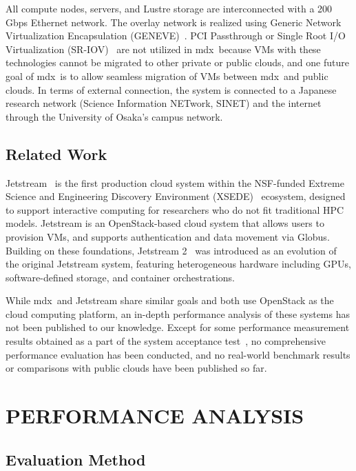 \documentclass[a4paper,twoside]{article}
\newcommand{\mdx}{mdx\,\uppercase\expandafter{\romannumeral 2\relax}}
\begin{document}
All compute nodes, servers, and Lustre storage are interconnected with a 200\,Gbps Ethernet network.
The overlay network is realized using Generic Network Virtualization Encapsulation
(GENEVE)~\cite{Gross2020}. PCI Passthrough or Single Root I/O Virtualization
(SR-IOV)~\cite{Lockwood2014} are not utilized in \mdx{} because VMs with these technologies cannot
be migrated to other private or public clouds, and one future goal of \mdx{} is to allow seamless
migration of VMs between \mdx{} and public clouds. In terms of external connection, the system is
connected to a Japanese research network (Science Information NETwork, SINET) and the internet
through the University of Osaka's campus network.

\subsection{Related Work}
Jetstream~\cite{Stewart2015} is the first production cloud system within the NSF-funded Extreme
Science and Engineering Discovery Environment (XSEDE)~\cite{Towns2014} ecosystem, designed to
support interactive computing for researchers who do not fit traditional HPC models. Jetstream is an
OpenStack-based cloud system that allows users to provision VMs, and supports authentication and
data movement via Globus. Building on these foundations, Jetstream 2~\cite{Hancock2021} was
introduced as an evolution of the original Jetstream system, featuring heterogeneous hardware
including GPUs, software-defined storage, and container orchestrations.

While \mdx{} and Jetstream share similar goals and both use OpenStack as the cloud computing
platform, an in-depth performance analysis of these systems has not been published to our knowledge.
Except for some performance measurement results obtained as a part of the system acceptance
test~\cite{Stewart2016}, no comprehensive performance evaluation has been conducted, and no
real-world benchmark results or comparisons with public clouds have been published so far.

\section{\uppercase{Performance Analysis}}%
\label{sec:evaluation}

\subsection{Evaluation Method}
\end{document}
